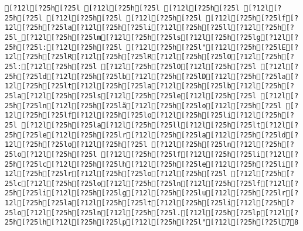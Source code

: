 \documentclass{scrartcl}
\begin{document}
\begin{Verbatim}
[?12l[?25h[?25l [?12l[?25h[?25l [?12l[?25h[?25l [?12l[?25h[?25l [?12l[?25h[?25l [?12l[?25h[?25l [?12l[?25h[?25lf[?12l[?25h[?25la[?12l[?25h[?25li[?12l[?25h[?25ll[?12l[?25h[?25l_[?12l[?25h[?25lm[?12l[?25h[?25ls[?12l[?25h[?25lg[?12l[?25h[?25l:[?12l[?25h[?25l [?12l[?25h[?25l"[?12l[?25h[?25lE[?12l[?25h[?25lR[?12l[?25h[?25lR[?12l[?25h[?25lO[?12l[?25h[?25l:[?12l[?25h[?25l [?12l[?25h[?25lO[?12l[?25h[?25l [?12l[?25h[?25ld[?12l[?25h[?25lb[?12l[?25h[?25lD[?12l[?25h[?25la[?12l[?25h[?25lt[?12l[?25h[?25la[?12l[?25h[?25lb[?12l[?25h[?25la[?12l[?25h[?25ls[?12l[?25h[?25le[?12l[?25h[?25l [?12l[?25h[?25ln[?12l[?25h[?25lã[?12l[?25h[?25lo[?12l[?25h[?25l [?12l[?25h[?25lf[?12l[?25h[?25lo[?12l[?25h[?25li[?12l[?25h[?25l [?12l[?25h[?25la[?12l[?25h[?25ll[?12l[?25h[?25lt[?12l[?25h[?25le[?12l[?25h[?25lr[?12l[?25h[?25la[?12l[?25h[?25ld[?12l[?25h[?25lo[?12l[?25h[?25l [?12l[?25h[?25ln[?12l[?25h[?25lo[?12l[?25h[?25l [?12l[?25h[?25lf[?12l[?25h[?25li[?12l[?25h[?25lc[?12l[?25h[?25lh[?12l[?25h[?25le[?12l[?25h[?25li[?12l[?25h[?25lr[?12l[?25h[?25lo[?12l[?25h[?25l [?12l[?25h[?25lc[?12l[?25h[?25lo[?12l[?25h[?25ln[?12l[?25h[?25lf[?12l[?25h[?25li[?12l[?25h[?25lg[?12l[?25h[?25lu[?12l[?25h[?25lr[?12l[?25h[?25la[?12l[?25h[?25lt[?12l[?25h[?25li[?12l[?25h[?25lo[?12l[?25h[?25ln[?12l[?25h[?25l.[?12l[?25h[?25lp[?12l[?25h[?25lh[?12l[?25h[?25lp[?12l[?25h[?25l"[?12l[?25h[?25l78


\end{Verbatim}
\end{document}
